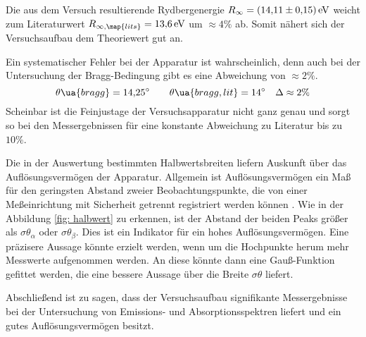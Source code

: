 Die aus dem Versuch resultierende Rydbergenergie $R_\infty=\SI{14.11\pm0.15}{\eV}$ weicht zum Literaturwert \cite{anleitung602} %
$R_{\infty,\map{lits}}=\SI{13.6}{\eV}$ um $\approx 4 \%$ ab. Somit nähert sich der
Versuchsaufbau dem Theoriewert gut an.

Ein systematischer Fehler bei der Apparatur ist wahrscheinlich, denn auch bei der %
Untersuchung der Bragg-Bedingung gibt es eine Abweichung von $\approx 2\%$.
\begin{equation*}
  \theta\ua{bragg}=\SI{14.25}{\degree}  \qquad \theta\ua{bragg,lit}=\SI{14}{\degree} \quad \Delta\approx2\%
\end{equation*}
Scheinbar ist die Feinjustage der Versuchsapparatur nicht ganz genau und sorgt so bei den Messergebnissen
für eine konstante Abweichung zu Literatur bis zu $10\%$.

Die in der Auswertung bestimmten Halbwertsbreiten liefern Auskunft über das
Auflösungsvermögen der Apparatur. %
Allgemein ist Auflösungsvermögen ein Maß für den geringsten Abstand zweier Beobachtungspunkte, %
die von einer Meßeinrichtung mit Sicherheit getrennt registriert werden können \cite{aufloes}.
Wie in der Abbildung \ref{fig: halbwert} zu erkennen, ist der Abstand der beiden Peaks
größer als $\sigma\theta_\alpha$ oder $\sigma\theta_\beta$. Dies ist ein Indikator
für ein hohes Auflösungsvermögen. Eine präzisere Aussage könnte erzielt werden,
wenn um die Hochpunkte herum mehr Messwerte aufgenommen werden. An diese
könnte dann eine Gauß-Funktion gefittet werden, die eine bessere Aussage über die
Breite $\sigma\theta$ liefert.

Abschließend ist zu sagen, dass der Versuchsaufbau signifikante Messergebnisse
bei der Untersuchung von Emissions- und Absorptionsspektren liefert und ein
gutes Auflösungsvermögen besitzt.
